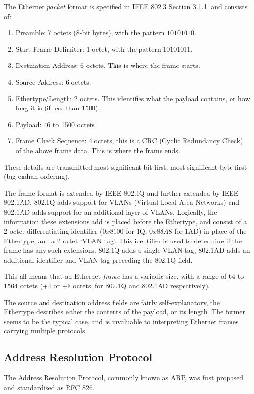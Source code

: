 \documentclass[10pt,a4paper,notitlepage]{report}
\begin{document}
The Ethernet \emph{packet} format is specified in IEEE 802.3 Section 3.1.1\cite{ieee802.3}, and consists of:
\begin{enumerate}
\item Preamble: 7 octets (8-bit bytes), with the pattern $10101010$.
\item Start Frame Delimiter: 1 octet, with the pattern $10101011$.
\item Destination Address: 6 octets. This is where the frame starts.
\item Source Address: 6 octets.
\item Ethertype/Length: 2 octets. This identifies what the payload contains, or how long it is (if less than 1500).
\item Payload: 46 to 1500 octets
\item Frame Check Sequence: 4 octets, this is a CRC (Cyclic Redundancy Check) of the above frame data. This is where the frame ends.
\end{enumerate}

These details are transmitted most significant bit first, most significant byte first (big-endian ordering).

The frame format is extended by IEEE 802.1Q and further extended by IEEE 802.1AD. 802.1Q adds support for VLANs (Virtual Local Area Networks) and 802.1AD adds support for an additional layer of VLANs.
Logically, the information these extensions add is placed before the Ethertype, and consist of a 2 octet differentiating identifier ($0x8100$ for 1Q, $0x88A8$ for 1AD) in place of the Ethertype, and a 2 octet `VLAN tag'. This identifier is used to determine if the frame has any such extensions. 802.1Q adds a single VLAN tag, 802.1AD adds an additional identifier and VLAN tag preceding the 802.1Q field.

This all means that an Ethernet \emph{frame} has a variadic size, with a range of $64$ to $1564$ octets ($+4$ or $+8$ octets, for 802.1Q and 802.1AD respectively).

The source and destination address fields are fairly self-explanatory, the Ethertype describes either the contents of the payload, or its length. The former seems to be the typical case, and is invaluable to interpreting Ethernet frames carrying multiple protocols.

\subsection{Address Resolution Protocol}
\label{sec:arp}
The Address Resolution Protocol, commonly known as ARP, was first proposed and standardised as RFC 826\cite{rfc826}.
\end{document}

